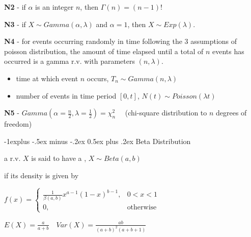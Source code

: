 \documentclass[10pt, landscape]{article}
\makeatletter
\renewcommand{\subsection}{\@startsection{subsection}{2}{0mm}%
  {-1explus -.5ex minus -.2ex}%
  {0.5ex plus .2ex}%
{\normalfont\normalsize\bfseries}}
\makeatother
\begin{document}
\begin{multicols*}{3}
\begin{minipage}[c]{0.55\linewidth}
    \textbf{N2} - if $\alpha$ is an integer $n$, then $\Gamma(n) = (n-1)!$

    \textbf{N3} - if $X \sim Gamma(\alpha, \lambda)$ and $\alpha = 1$, then $X \sim Exp(\lambda)$.
  \end{minipage}

  \textbf{N4} - for events occurring randomly in time following the 3 assumptions of poisson distribution, 
  the amount of time elapsed until a total of $n$ events has occurred is a gamma r.v. with parameters $(n, \lambda)$.
  \begin{itemize}
    \item time at which event $n$ occurs, $T_n \sim Gamma(n, \lambda)$ 
    \item number of events in time period $[0, t]$, $N(t) \sim Poisson(\lambda t)$
  \end{itemize}

  \textbf{N5} - $Gamma(\alpha = \frac{n}{2}, \lambda = \frac{1}{2}) = \chi^2_n \quad$ (chi-square distribution to $n$ degrees of freedom)


  \subsection{Beta Distribution}

  a r.v. $X$ is said to have a , $X \sim Beta(a, b)$ 

  if its density is given by 

  \begin{tightcenter}
    $f(x) = \begin{cases} \frac{1}{\beta(a, b)} x^{a-1} (1-x)^{b-1}, &0 < x < 1 \\ 0, &\text{otherwise} \end{cases} $

    $E(X) = \frac{a}{a+b} \quad Var(X) = \frac{ab}{(a+b)^2 (a+b+1)} $
  \end{tightcenter}


\end{multicols*}
\end{document}
